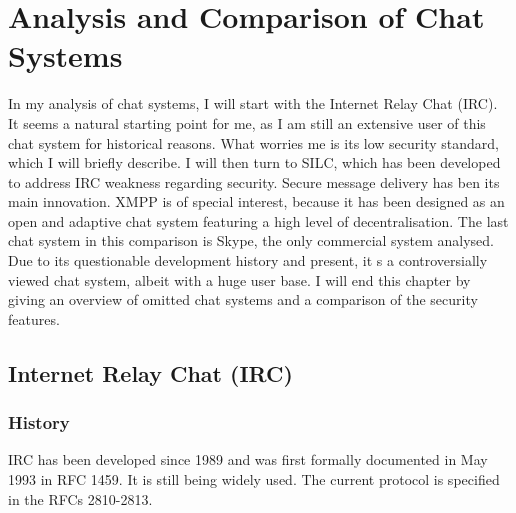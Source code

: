 \chapter{Analysis and Comparison of Chat Systems}
\label{chatsystems}
In my analysis of chat systems, I will start with
the Internet Relay Chat (IRC). It seems a natural starting point for me,
as I am still an extensive user of this chat system for historical reasons.
What worries me is its low security standard, which I will briefly describe.
I will then turn to SILC, which has been developed to address IRC weakness
regarding security. Secure message delivery has ben its main
innovation. XMPP is of special interest, because it has been designed as an
open and adaptive chat system featuring a high level of decentralisation.
The last chat system in this comparison is Skype, the only commercial
system analysed. Due to its questionable development history and present, it s
a controversially viewed chat system, albeit with a huge user base.
I will end this chapter by giving an overview of omitted chat systems
and a comparison of the security features.
\section{Internet Relay Chat (IRC)}
\subsection{History}
IRC has been developed since 1989 and was first formally documented in May 1993 in 
RFC 1459\cite{rfc1459}. It is still being widely used.\cite{ircusage}
The current protocol is specified in the RFCs 2810-2813\cite{rfc2810,rfc2811,rfc2812,rfc2813}.
